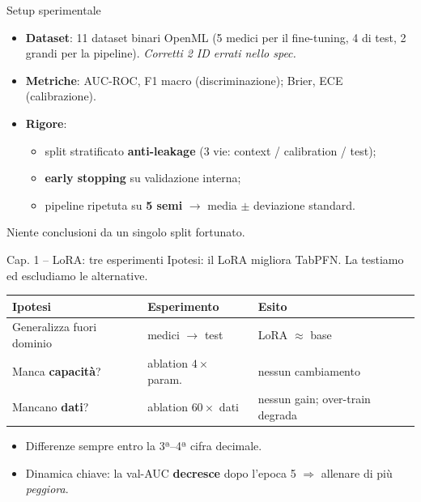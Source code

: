 \documentclass[11pt,aspectratio=169]{beamer}
\begin{document}
\begin{frame}{Setup sperimentale}
\begin{itemize}
  \item \textbf{Dataset}: 11 dataset binari OpenML (5 medici per il fine-tuning,
  4 di test, 2 grandi per la pipeline). \emph{Corretti 2 ID errati nello spec.}
  \item \textbf{Metriche}: AUC-ROC, F1 macro (discriminazione); Brier, ECE
  (calibrazione).
  \item \textbf{Rigore}:
  \begin{itemize}
    \item split stratificato \textbf{anti-leakage} (3 vie: context / calibration / test);
    \item \textbf{early stopping} su validazione interna;
    \item pipeline ripetuta su \textbf{5 semi} $\to$ media $\pm$ deviazione standard.
  \end{itemize}
\end{itemize}
\vfill
\centering
\alert{Niente conclusioni da un singolo split fortunato.}
\end{frame}

\begin{frame}{Cap. 1 -- LoRA: tre esperimenti}
Ipotesi: il LoRA migliora TabPFN. La testiamo ed escludiamo le alternative.
\vfill
\begin{table}
\centering\small
\begin{tabular}{lll}
\toprule
Ipotesi & Esperimento & Esito \\
\midrule
Generalizza fuori dominio & medici $\to$ test & LoRA $\approx$ base \\
Manca \textbf{capacità}?   & ablation $4\times$ param. & nessun cambiamento \\
Mancano \textbf{dati}?     & ablation $60\times$ dati  & nessun gain; over-train degrada \\
\bottomrule
\end{tabular}
\end{table}
\vfill
\begin{itemize}
  \item Differenze sempre entro la 3ª--4ª cifra decimale.
  \item Dinamica chiave: la val-AUC \textbf{decresce} dopo l'epoca 5
  $\Rightarrow$ allenare di più \emph{peggiora}.
\end{itemize}
\end{frame}
\end{document}
